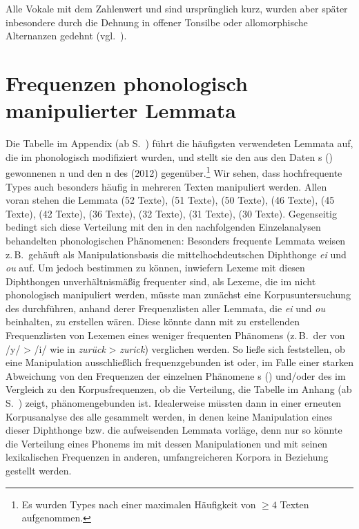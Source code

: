 \begin{table}
\parbox{.9\textwidth}{{\textsuperscript{\dag}\footnotesize Alle Vokale mit dem Zahlenwert  und  sind ursprünglich kurz, wurden aber später inbesondere durch die Dehnung in offener Tonsilbe oder allomorphische Alternanzen gedehnt (vgl.\, \citealt[1024]{Katz1983}).} 
}
\end{table} 

\section{Frequenzen phonologisch manipulierter Lemmata}

Die Tabelle  im Appendix (ab S.\, \pageref{tblFKphon}) führt die häufigsten verwendeten Lemmata auf, die im  phonologisch modifiziert wurden, und stellt sie den aus den Daten \citeauthor{Ruoff1981}s (\citeyear{Ruoff1981}) gewonnenen n und den n des  (2012) gegenüber.\footnote{Es wurden Types nach einer maximalen Häufigkeit von \( \geq4 \)  Texten aufgenommen.} Wir sehen, dass hochfrequente Types auch besonders häufig in mehreren Texten manipuliert werden. Allen voran stehen die Lemmata  (52 Texte),  (51 Texte),  (50 Texte),  (46 Texte),  (45 Texte),  (42 Texte),  (36 Texte),  (32 Texte),  (31 Texte),  (30 Texte). Gegenseitig bedingt sich diese Verteilung mit den in den nachfolgenden Einzelanalysen behandelten phonologischen Phänomenen: Besonders frequente Lemmata weisen z.\,B.\, gehäuft als Manipulationsbasis die mittelhochdeutschen Diphthonge \textit{ei} und \textit{ou} auf. Um jedoch bestimmen zu können, inwiefern Lexeme mit diesen Diphthongen unverhältnismäßig frequenter sind, als Lexeme, die im  nicht phonologisch manipuliert werden, müsste man zunächst eine Korpusuntersuchung des  durchführen, anhand derer Frequenzlisten aller Lemmata, die {\mhd} \textit{ei} und \textit{ou} beinhalten, zu erstellen wären. Diese könnte dann mit zu erstellenden Frequenzlisten von Lexemen eines weniger frequenten Phänomens (z.\,B.\, der  von /y/ > /i/ wie in \textit{zurück} > \textit{zurick}) verglichen werden. So ließe sich feststellen, ob eine Manipulation ausschließlich frequenzgebunden ist oder, im Falle einer starken Abweichung von den Frequenzen der einzelnen Phänomene \citeauthor{Ruoff1981}s (\citeyear{Ruoff1981}) und/oder des  im Vergleich zu den Korpusfrequenzen, ob die Verteilung, die Tabelle im Anhang (ab S.\, \pageref{tblFKphon}) zeigt, phänomengebunden ist. Idealerweise müssten dann in einer erneuten Korpusanalyse des \hai{{\LiJi}} alle  gesammelt werden, in denen keine Manipulation eines dieser Diphthonge bzw. die  aufweisenden Lemmata  vorläge,  denn nur so könnte die Verteilung eines Phonems im  mit dessen Manipulationen und mit seinen lexikalischen Frequenzen in anderen, umfangreicheren Korpora in Beziehung gestellt werden. 
